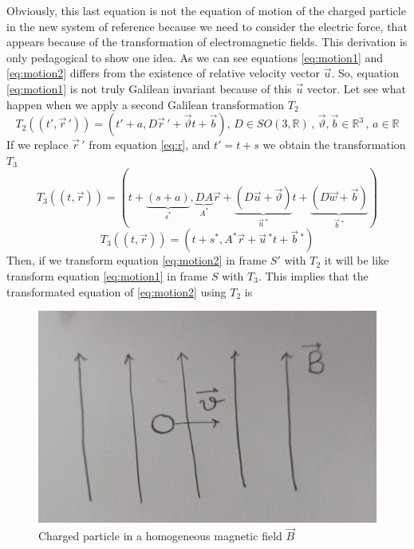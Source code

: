 \documentclass[11pt, letterpaper]{article}
\def\Re{\mathbb{R}}
\begin{document}
Obviously, this last equation is not the equation of motion of the charged particle in the new system of reference because we need to consider the electric force, that appears because of the transformation of electromagnetic fields. This derivation is only pedagogical to show one idea. As we can see equations \ref{eq:motion1} and \ref{eq:motion2} differs from the existence of relative velocity vector $\vec{u}$. So, equation \ref{eq:motion1} is not truly Galilean invariant because of this $\vec{u}$ vector. Let see what happen when we apply a second Galilean transformation $T_2$
\begin{equation}
	T_2((t',\vec{r}\,')) =\left(t'+a, D \vec{r}\,'+\vec{\vartheta}t + \vec{b}\right),\, D\in SO(3,\Re)\,,\, \vec{\vartheta},\vec{b}\in\Re^3\,,\,a\in\Re
\end{equation}
If we replace $\vec{r}\,'$ from equation \ref{eq:r}, and $t'=t+s$ we obtain the transformation $T_3$
\begin{equation}
	T_3((t,\vec{r}))= \left(t+\underbrace{(s+a)}_{s^*},\underbrace{DA}_{A^*}\vec{r}+\underbrace{(D\vec{u}+\vec{\vartheta})}_{\vec{u}\,^*}t+\underbrace{(D\vec{w}+\vec{b})}_{\vec{b}\,^*}\right)
\end{equation}
\begin{equation}
	T_3((t,\vec{r})) = \left(t+s^*, A^*\vec{r}+\vec{u}\,^*t+\vec{b}\,^* \right)
\end{equation}
Then, if we transform equation \ref{eq:motion2} in frame $S'$ with $T_2$  it will be like transform equation \ref{eq:motion1} in frame $S$ with $T_3$. This implies that the transformated equation of \ref{eq:motion2} using $T_2$ is
\begin{figure}[ht]
	\centering
	\includegraphics[width = 0.5 \linewidth]{images/charged_particle_homogeneus_B.jpeg}
	\caption{Charged particle in a homogeneous magnetic field $\vec{B}$}
	\label{fig:cparticle}
\end{figure}
\end{document}
